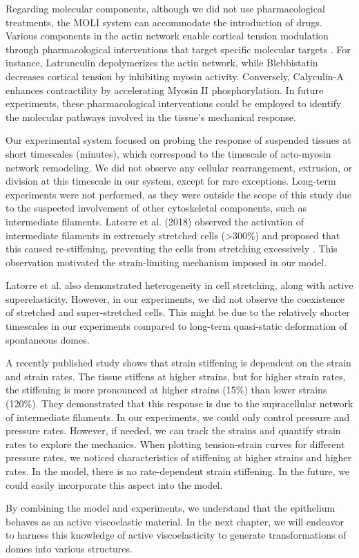 Regarding molecular components, although we did not use pharmacological treatments, the MOLI system can accommodate the introduction of drugs. Various components in the actin network enable cortical tension modulation through pharmacological interventions that target specific molecular targets \cite{cartagena-rivera2016}. For instance, Latrunculin depolymerizes the actin network, while Blebbistatin decreases cortical tension by inhibiting myosin activity. Conversely, Calyculin-A enhances contractility by accelerating Myosin II phosphorylation. In future experiments, these pharmacological interventions could be employed to identify the molecular pathways involved in the tissue's mechanical response.

Our experimental system focused on probing the response of suspended tissues at short timescales (minutes), which correspond to the timescale of acto-myosin network remodeling. We did not observe any cellular rearrangement, extrusion, or division at this timescale in our system, except for rare exceptions. Long-term experiments were not performed, as they were outside the scope of this study due to the suspected involvement of other cytoskeletal components, such as intermediate filaments. Latorre et al. (2018) observed the activation of intermediate filaments in extremely stretched cells (>300\%) and proposed that this caused re-stiffening, preventing the cells from stretching excessively \cite{latorre2018}. This observation motivated the strain-limiting mechanism imposed in our model.

Latorre et al. also demonstrated heterogeneity in cell stretching, along with active superelasticity. However, in our experiments, we did not observe the coexistence of stretched and super-stretched cells. This might be due to the relatively shorter timescales in our experiments compared to long-term quasi-static deformation of spontaneous domes.

A recently published study \cite{duque2023} shows that strain stiffening is dependent on the strain and strain rates. The tissue stiffens at higher strains, but for higher strain rates, the stiffening is more pronounced at higher strains (15\%) than lower strains (120\%). They demonstrated that this response is due to the supracellular network of intermediate filaments. In our experiments, we could only control pressure and pressure rates. However, if needed, we can track the strains and quantify strain rates to explore the mechanics. When plotting tension-strain curves for different pressure rates, we noticed characteristics of stiffening at higher strains and higher rates. In the model, there is no rate-dependent strain stiffening. In the future, we could easily incorporate this aspect into the model.

By combining the model and experiments, we understand that the epithelium behaves as an active viscoelastic material. In the next chapter, we will endeavor to harness this knowledge of active viscoelasticity to generate transformations of domes into various structures.
